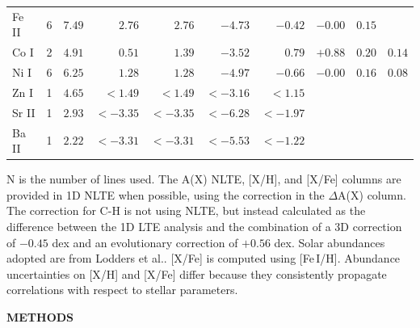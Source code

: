 \documentclass{natureprintstyle}
\begin{document}
\begin{table}
\begin{tabular}{lrrrrrrrcc}
Fe II &  6 &$ 7.49$&$   { 2.76}$&$   { 2.76}$&$   {-4.73}$&$   {-0.42}$&$-0.00$&$0.15$&$    $\\
Co I  &  2 &$ 4.91$&$   { 0.51}$&$   { 1.39}$&$   {-3.52}$&$   { 0.79}$&$+0.88$&$0.20$&$0.14$\\
Ni I  &  6 &$ 6.25$&$   { 1.28}$&$   { 1.28}$&$   {-4.97}$&$   {-0.66}$&$-0.00$&$0.16$&$0.08$\\
Zn I  &  1 &$ 4.65$&${<}{ 1.49}$&${<}{ 1.49}$&${<}{-3.16}$&${<}{ 1.15}$&       &$    $&$    $\\
Sr II &  1 &$ 2.93$&${<}{-3.35}$&${<}{-3.35}$&${<}{-6.28}$&${<}{-1.97}$&       &$    $&$    $\\
Ba II &  1 &$ 2.22$&${<}{-3.31}$&${<}{-3.31}$&${<}{-5.53}$&${<}{-1.22}$&       &$    $&$    $\\
\hline
\end{tabular}

N is the number of lines used.
The A(X) NLTE, [X/H], and [X/Fe] columns are provided in 1D NLTE when possible, using the correction in the $\Delta$A(X) column.
The correction for C-H is not using NLTE, but instead calculated as the difference between the 1D LTE analysis and the combination of a 3D correction of $-0.45$ dex\cite{Eitner2024} and an evolutionary correction of $+0.56$ dex\cite{Placco2014}.
Solar abundances adopted are from Lodders et al.\cite{Lodders2025,Bergemann2025}.
[X/Fe] is computed using [Fe\,I/H].
Abundance uncertainties on [X/H] and [X/Fe] differ because they consistently propagate correlations with respect to stellar parameters.
\end{table}

\newpage

\begin{center}
{\bf \Large \uppercase{Methods} }
\end{center}

\captionsetup[figure]{labelformat=empty}
\captionsetup[table]{labelformat=empty}
\setcounter{figure}{0}    
\renewcommand{\thefigure}{Extended Data Figure \arabic{figure}}
\renewcommand{\thetable}{Extended Data Table \arabic{table}}
\end{document}
